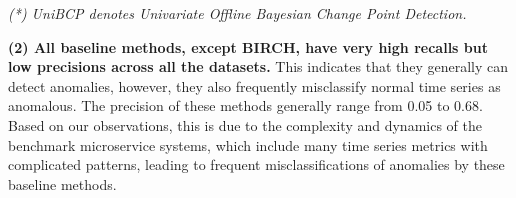 \begin{table}
\centering
\caption{Precision, Recall, and F1-score of five anomaly detectors on three datasets: Online Boutique, Sock Shop, and Train Ticket. The best scores are in \textbf{bold}. Higher values indicate better performance.}
\vspace{-0.2cm}
\label{tab:ad1}

{\footnotesize \textit{(*) UniBCP denotes Univariate Offline Bayesian Change Point Detection.}}

\vspace{-0.2cm}
\end{table}


\textbf{(2) All baseline methods, except BIRCH, have very high recalls but low precisions across all the datasets.} This indicates that they generally can detect anomalies, however, they also frequently misclassify normal time series as anomalous. The precision of these methods generally range from 0.05 to 0.68. Based on our observations, this is due to the complexity and dynamics of the benchmark microservice systems, which include many time series metrics with complicated patterns, leading to frequent misclassifications of anomalies by these baseline methods.

